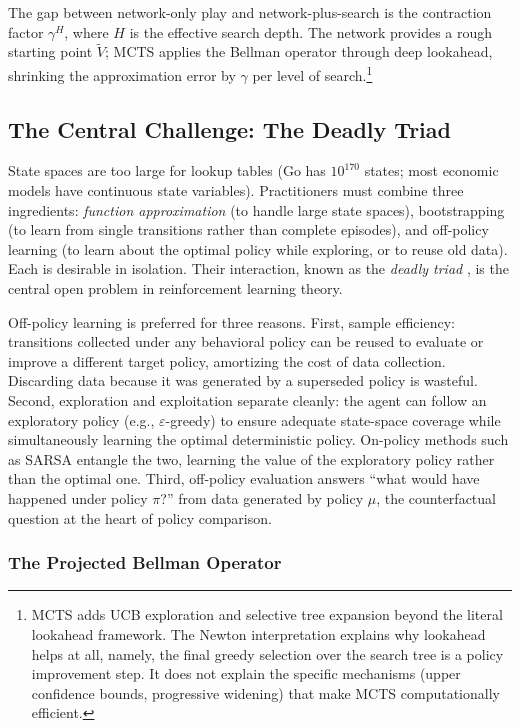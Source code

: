 The gap between network-only play and network-plus-search is the contraction factor $\gamma^H$, where $H$ is the effective search depth. The network provides a rough starting point $\tilde{V}$; MCTS applies the Bellman operator through deep lookahead, shrinking the approximation error by $\gamma$ per level of search.\footnote{MCTS adds UCB exploration and selective tree expansion beyond the literal lookahead framework. The Newton interpretation explains why lookahead helps at all, namely, the final greedy selection over the search tree is a policy improvement step. It does not explain the specific mechanisms (upper confidence bounds, progressive widening) that make MCTS computationally efficient.}

\subsection{The Central Challenge: The Deadly Triad}
\label{sec:deadly_triad}

State spaces are too large for lookup tables (Go has $10^{170}$ states; most economic models have continuous state variables). Practitioners must combine three ingredients: \textit{function approximation} (to handle large state spaces), bootstrapping (to learn from single transitions rather than complete episodes), and off-policy learning (to learn about the optimal policy while exploring, or to reuse old data). Each is desirable in isolation. Their interaction, known as the \emph{deadly triad} \citep[Ch.~11]{sutton2018}, is the central open problem in reinforcement learning theory.

Off-policy learning is preferred for three reasons. First, sample efficiency: transitions collected under any behavioral policy can be reused to evaluate or improve a different target policy, amortizing the cost of data collection. Discarding data because it was generated by a superseded policy is wasteful. Second, exploration and exploitation separate cleanly: the agent can follow an exploratory policy (e.g., $\varepsilon$-greedy) to ensure adequate state-space coverage while simultaneously learning the optimal deterministic policy. On-policy methods such as SARSA entangle the two, learning the value of the exploratory policy rather than the optimal one. Third, off-policy evaluation answers ``what would have happened under policy $\pi$?'' from data generated by policy $\mu$, the counterfactual question at the heart of policy comparison.

\subsubsection{The Projected Bellman Operator}

